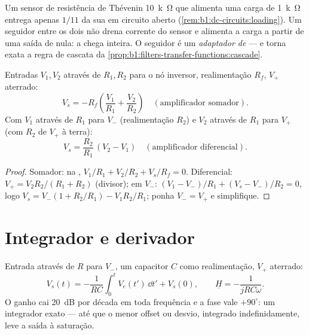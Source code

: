 \begin{example}\label{ex:b1:operational-amplifier:follower}
Um sensor de resistência de Thévenin \qty{10}{k\ohm} que alimenta uma carga de \qty{1}{k\ohm}
entrega apenas $1/11$ da sua  em circuito aberto
(\cref{rem:b1:dc-circuits:loading}). Um seguidor entre os dois não drena
corrente do sensor e alimenta a carga a partir de uma saída de 
nula: a  chega inteira. O seguidor é um \emph{adaptador de
} --- e torna exata a regra de cascata da
\cref{prop:b1:filters-transfer-functions:cascade}.
\end{example}

\begin{proposition}\label{prop:b1:operational-amplifier:sumdiff}
Entradas $V_1, V_2$ através de $R_1, R_2$ para o nó inversor, realimentação
$R_f$, $V_+$ aterrado:
\[
V_s = -R_f\left(\frac{V_1}{R_1} + \frac{V_2}{R_2}\right)
\quad (\text{amplificador somador}).
\]
Com $V_1$ através de $R_1$ para $V_-$ (realimentação $R_2$) e $V_2$ através de
$R_1$ para $V_+$ (com $R_2$ de $V_+$ à terra):
\[
V_s = \frac{R_2}{R_1}\,(V_2 - V_1)
\quad (\text{amplificador diferencial}).
\]
\end{proposition}

\begin{proof}
Somador:  na , $V_1/R_1 + V_2/R_2 + V_s/R_f =
0$. Diferencial: $V_+ = V_2R_2/(R_1 + R_2)$ (divisor);  em $V_-$:
$(V_1 - V_-)/R_1 + (V_s - V_-)/R_2 = 0$, logo $V_s = V_-(1 + R_2/R_1) -
V_1R_2/R_1$; ponha $V_- = V_+$ e simplifique.
\end{proof}

\section{Integrador e derivador}

\begin{proposition}[Integrador]\label{prop:b1:operational-amplifier:integrator}
Entrada através de $R$ para $V_-$, um capacitor $C$ como realimentação, $V_+$
aterrado:
\[
V_s(t) = -\frac{1}{RC}\int_0^t V_e(t')\,\dd t' + V_s(0),
\qquad
\underline H = -\frac{1}{jRC\omega} .
\]
O ganho cai \qty{20}{dB} por década em toda frequência e a fase
vale $+90^\circ$: um integrador exato --- até que o menor offset ou
desvio, integrado indefinidamente, leve a saída à saturação.
\end{proposition}

